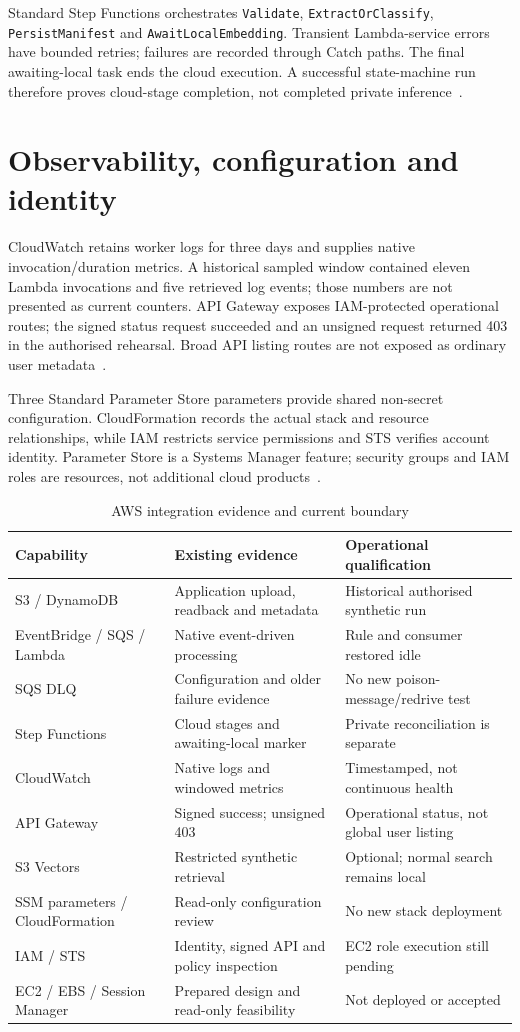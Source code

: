 Standard Step Functions orchestrates \texttt{Validate}, \texttt{ExtractOrClassify}, \texttt{PersistManifest} and \texttt{AwaitLocalEmbedding}. Transient Lambda-service errors have bounded retries; failures are recorded through Catch paths. The final awaiting-local task ends the cloud execution. A successful state-machine run therefore proves cloud-stage completion, not completed private inference~\cite{stepfunctions}.
\section{Observability, configuration and identity}
CloudWatch retains worker logs for three days and supplies native invocation/duration metrics. A historical sampled window contained eleven Lambda invocations and five retrieved log events; those numbers are not presented as current counters. API Gateway exposes IAM-protected operational routes; the signed status request succeeded and an unsigned request returned 403 in the authorised rehearsal. Broad API listing routes are not exposed as ordinary user metadata~\cite{cloudwatch,apigateway}.

Three Standard Parameter Store parameters provide shared non-secret configuration. CloudFormation records the actual stack and resource relationships, while IAM restricts service permissions and STS verifies account identity. Parameter Store is a Systems Manager feature; security groups and IAM roles are resources, not additional cloud products~\cite{ssm,cloudformation,iam}.
\par\begin{table}[htbp]\caption{AWS integration evidence and current boundary}\label{tab:aws}\small\begin{tabularx}{\linewidth}{p{.22\linewidth}YY}\toprule Capability&Existing evidence&Operational qualification\\\midrule
S3 / DynamoDB&Application upload, readback and metadata&Historical authorised synthetic run\\
EventBridge / SQS / Lambda&Native event-driven processing&Rule and consumer restored idle\\
SQS DLQ&Configuration and older failure evidence&No new poison-message/redrive test\\
Step Functions&Cloud stages and awaiting-local marker&Private reconciliation is separate\\
CloudWatch&Native logs and windowed metrics&Timestamped, not continuous health\\
API Gateway&Signed success; unsigned 403&Operational status, not global user listing\\
S3 Vectors&Restricted synthetic retrieval&Optional; normal search remains local\\
SSM parameters / CloudFormation&Read-only configuration review&No new stack deployment\\
IAM / STS&Identity, signed API and policy inspection&EC2 role execution still pending\\
EC2 / EBS / Session Manager&Prepared design and read-only feasibility&Not deployed or accepted\\\bottomrule\end{tabularx}\end{table}\par
